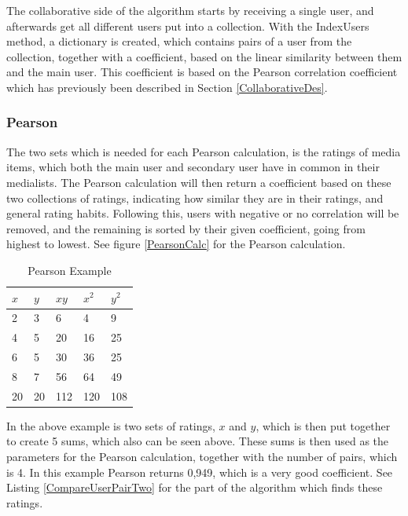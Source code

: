 The collaborative side of the algorithm starts by receiving a single user, and afterwards get all different users put into a collection. With the IndexUsers method, a dictionary is created, which contains pairs of a user from the collection, together with a coefficient, based on the linear similarity between them and the main user. This coefficient is based on the Pearson correlation coefficient which has previously been described in Section \ref{CollaborativeDes}.

\subsubsection{Pearson}

The two sets which is needed for each Pearson calculation, is the ratings of media items, which both the main user and secondary user have in common in their medialists. The Pearson calculation will then return a coefficient based on these two collections of ratings, indicating how similar they are in their ratings, and general rating habits. Following this, users with negative or no correlation will be removed, and the remaining is sorted by their given coefficient, going from highest to lowest. See figure \ref{PearsonCalc} for the Pearson calculation.

\begin{table}[htb]
\centering
\begin{tabular}{|l|l|l|l|l|} \hline
	\textbf{$x$} & \textbf{$y$} & \textbf{$xy$}
	& \textbf{$x^2$} & \textbf{$y^2$} \\ \hline
	2 & 3 & 6 & 4 & 9 \\ \hline
	4 & 5 & 20 & 16 & 25 \\ \hline
	6 & 5 & 30 & 36 & 25 \\ \hline
	8 & 7 & 56 & 64 & 49 \\ \hline\hline
	20 & 20 & 112 & 120 & 108 \\ \hline
\end{tabular}
\caption{Pearson Example}
\label{PearsonEx}
\end{table} 

In the above example is two sets of ratings, $x$ and $y$, which is then put together to create 5 sums, which also can be seen above. These sums is then used as the parameters for the Pearson calculation, together with the number of pairs, which is 4. In this example Pearson returns 0,949, which is a very good coefficient. See Listing \ref{CompareUserPairTwo} for the part of the algorithm which finds these ratings.

